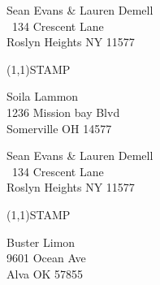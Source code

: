 \documentclass[12pt]{article}
\begin{document}
\clearpage

\begin{minipage}{.5\linewidth} \noindent
Sean Evans \& Lauren Demell\\\ 
134 Crescent Lane\\ 
Roslyn Heights NY 11577
\end{minipage}
\begin{minipage}{.5\linewidth \hspace{-.2in} \vspace{-.3in}}
\begin{flushright}
\framebox(1,1){STAMP}
\end{flushright}
\end{minipage}

\begin{center} \begin{Huge} \vspace*{\fill}
Soila Lammon\\
1236 Mission bay Blvd\\
Somerville OH 14577\\
\vspace{\fill} \end{Huge} \end{center}

\clearpage

\begin{minipage}{.5\linewidth} \noindent
Sean Evans \& Lauren Demell\\\ 
134 Crescent Lane\\ 
Roslyn Heights NY 11577
\end{minipage}
\begin{minipage}{.5\linewidth \hspace{-.2in} \vspace{-.3in}}
\begin{flushright}
\framebox(1,1){STAMP}
\end{flushright}
\end{minipage}

\begin{center} \begin{Huge} \vspace*{\fill}
Buster Limon\\
9601 Ocean Ave\\
Alva OK 57855\\
\vspace{\fill} \end{Huge} \end{center}

\clearpage
\end{document}
